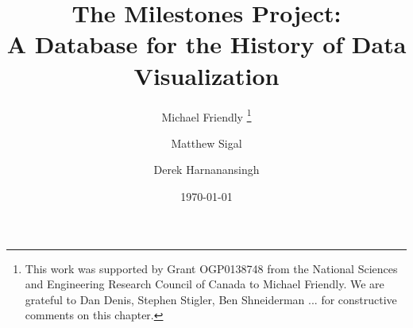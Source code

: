 \documentclass[11pt]{article}
\newcommand{\TODO}[1]{\begin{quotation}\noindent\color{blue}\textbf{ToDo}: #1\end{quotation}}
\begin{document}
\title{The Milestones Project: \\ A Database for the History of Data Visualization}
\author{Michael Friendly%
\thanks{This work was supported by Grant OGP0138748 from the National Sciences and Engineering Research Council of Canada to Michael Friendly.
  We are grateful to Dan Denis, Stephen Stigler, Ben Shneiderman ... for constructive comments on this chapter.
  }
 \and Matthew Sigal 
 \and Derek Harnanansingh}
\date{\today}

\maketitle

\begin{abstract}
\begin{comment}
Re-reading the abstract, I think it could be rephrased slightly to update the language with more modern historical scholarship (most of the changes are in paragraph 1).  Here is what I propose:

Methods of data visualization have evolved substantially over their relatively brief history.
Landmarks in this story were the first thematic maps in the 1600s, the invention of the bar chart and the line graph in the early 1800s,
and the dynamic and interactive graphics of today.  While these developments have been previously detailed in various micro-histories,
they were aimed at a privileged and academic audience, and a publicly accessible and free space to house a macro-history in its totality did not exist.

The purpose of this chapter is threefold:
first, to introduce the reader our solution to this absence through an online resource called the Milestones Project.
This website highlights important events in the history of data visualization, and enables users to interactively travel through time to see and explore the
context that surrounded their developments.
Secondly, we present some striking visual examples that deal with conveying aspects of history over time, drawn from this resource.
Finally, the Milestones database itself will be used to showcase how such a resource can serve as ``data'' for \emph{statistical historiography},
which entails the use of statistical and graphical methods for the analysis and understanding of historical innovations, developments, and trends.
\end{comment}


\end{abstract}
\end{document}
